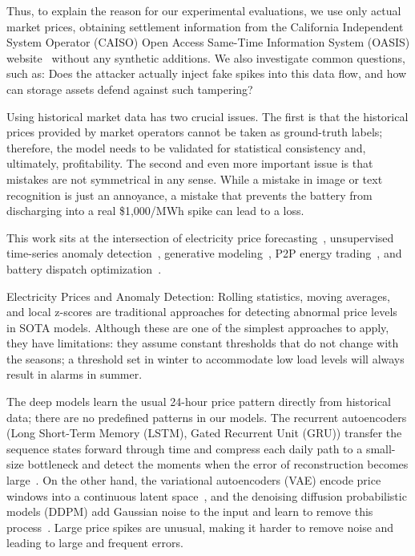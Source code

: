 \documentclass[journal]{IEEEtran}
\begin{document}
Thus, to explain the reason for our experimental evaluations, we use only actual market prices, obtaining settlement information from the California Independent System Operator (CAISO) Open Access Same-Time Information System (OASIS) website~\cite{CAISO} without any synthetic additions. We also investigate common questions, such as: Does the attacker actually inject fake spikes into this data flow, and how can storage assets defend against such tampering?

Using historical market data has two crucial issues. The first is that the historical prices provided by market operators cannot be taken as ground-truth labels; therefore, the model needs to be validated for statistical consistency and, ultimately, profitability. The second and even more important issue is that mistakes are not symmetrical in any sense. While a mistake in image or text recognition is just an annoyance, a mistake that prevents the battery from discharging into a real \$1,000/MWh spike can lead to a loss.

This work sits at the intersection of electricity price forecasting~\cite{Lago_EPF_Benchmark}, unsupervised time-series anomaly detection~\cite{AE_Anomaly, Audibert_USAD}, generative modeling~\cite{VAE, DDPM}, P2P energy trading~\cite{Chen_DRL_BESS, P2P_Systems_Book}, and battery dispatch optimization~\cite{RL_Dispatch, Shi_BESS_Coopt, He_CAISO_BESS, Sutton_RL}.

Electricity Prices and Anomaly Detection:
Rolling statistics, moving averages, and local z-scores are traditional approaches for detecting abnormal price levels in SOTA models. Although these are one of the simplest approaches to apply, they have limitations: they assume constant thresholds that do not change with the seasons; a threshold set in winter to accommodate low load levels will always result in alarms in summer.

The deep models learn the usual 24-hour price pattern directly from historical data; there are no predefined patterns in our models. The recurrent autoencoders (Long Short-Term Memory (LSTM), Gated Recurrent Unit (GRU)) transfer the sequence states forward through time and compress each daily path to a small-size bottleneck and detect the moments when the error of reconstruction becomes large~\cite{Audibert_USAD}. On the other hand, the variational autoencoders (VAE) encode price windows into a continuous latent space~\cite{VAE}, and the denoising diffusion probabilistic models (DDPM) add Gaussian noise to the input and learn to remove this process~\cite{DDPM}. Large price spikes are unusual, making it harder to remove noise and leading to large and frequent errors.
\end{document}
